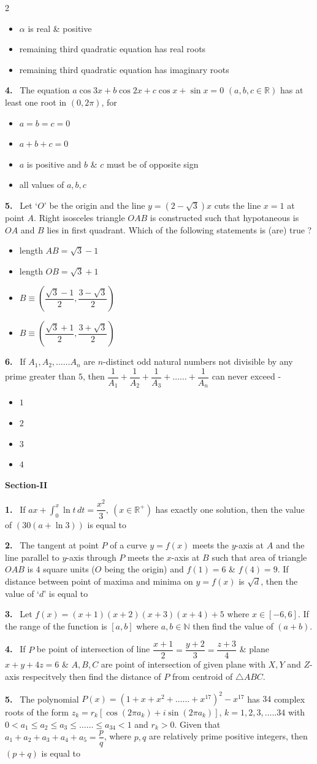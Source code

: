 \documentclass[10pt]{extarticle}
\newcommand{\sect}[1]{\par\smallskip\noindent\textbf{#1}\par}
\newcommand{\qn}[1]{\par\smallskip\noindent\textbf{#1.}~}
\newenvironment{qoptions}{\begin{itemize}[leftmargin=1.8em,itemsep=1pt,topsep=2pt,label={}]}{\end{itemize}}
\newcommand{\opt}[2]{\item[(#1)] #2}
\begin{document}
\begin{multicols}{2}
\begin{qoptions}
\opt{B}{$\alpha$ is real \& positive}
\opt{C}{remaining third quadratic equation has real roots}
\opt{D}{remaining third quadratic equation has imaginary roots}
\end{qoptions}
\qn{4} The equation $a\cos3x+b\cos2x+c\cos x+\sin x=0$ $(a,b,c\in\mathbb R)$ has at least one root in $(0,2\pi)$, for
\begin{qoptions}
\opt{A}{$a=b=c=0$}
\opt{B}{$a+b+c=0$}
\opt{C}{$a$ is positive and $b$ \& $c$ must be of opposite sign}
\opt{D}{all values of $a,b,c$}
\end{qoptions}
\qn{5} Let `$O$' be the origin and the line $y=\left(2-\sqrt3\right)x$ cuts the line $x=1$ at point $A$. Right isosceles triangle $OAB$ is constructed such that hypotaneous is $OA$ and $B$ lies in first quadrant. Which of the following statements is (are) true ?
\begin{qoptions}
\opt{A}{length $AB=\sqrt3-1$}
\opt{B}{length $OB=\sqrt3+1$}
\opt{C}{$B\equiv\left(\dfrac{\sqrt3-1}{2},\dfrac{3-\sqrt3}{2}\right)$}
\opt{D}{$B\equiv\left(\dfrac{\sqrt3+1}{2},\dfrac{3+\sqrt3}{2}\right)$}
\end{qoptions}
\qn{6} If $A_1,A_2,\ldots\ldots A_n$ are $n$-distinct odd natural numbers not divisible by any prime greater than $5$, then $\dfrac1{A_1}+\dfrac1{A_2}+\dfrac1{A_3}+\ldots\ldots+\dfrac1{A_n}$ can never exceed -
\begin{qoptions}
\opt{A}{$1$}
\opt{B}{$2$}
\opt{C}{$3$}
\opt{D}{$4$}
\end{qoptions}
\sect{Section-II}
\qn{1} If $ax+\displaystyle\int_0^x\ln t\,dt=\dfrac{x^2}{3},\ \left(x\in\mathbb R^+\right)$ has exactly one solution, then the value of $(30(a+\ln3))$ is equal to
\qn{2} The tangent at point $P$ of a curve $y=f(x)$ meets the $y$-axis at $A$ and the line parallel to $y$-axis through $P$ meets the $x$-axis at $B$ such that area of triangle $OAB$ is $4$ square units ($O$ being the origin) and $f(1)=6$ \& $f(4)=9$. If distance between point of maxima and minima on $y=f(x)$ is $\sqrt d$, then the value of `$d$' is equal to
\qn{3} Let $f(x)=(x+1)(x+2)(x+3)(x+4)+5$ where $x\in[-6,6]$. If the range of the function is $[a,b]$ where $a,b\in\mathbb N$ then find the value of $(a+b)$.
\qn{4} If $P$ be point of intersection of line $\dfrac{x+1}{2}=\dfrac{y+2}{3}=\dfrac{z+3}{4}$ \& plane $x+y+4z=6$ \& $A,B,C$ are point of intersection of given plane with $X,Y$ and $Z$-axis respecitvely then find the distance of $P$ from centroid of $\triangle ABC$.
\qn{5} The polynomial $P(x)=(1+x+x^2+\ldots\ldots+x^{17})^2-x^{17}$ has $34$ complex roots of the form $z_k=r_k[\cos(2\pi a_k)+i\sin(2\pi a_k)]$, $k=1,2,3,\ldots..34$ with $0<a_1\le a_2\le a_3\le\ldots\ldots\le a_{34}<1$ and $r_k>0$. Given that $a_1+a_2+a_3+a_4+a_5=\dfrac pq$, where $p,q$ are relatively prime positive integers, then $(p+q)$ is equal to

\end{multicols}
\end{document}
